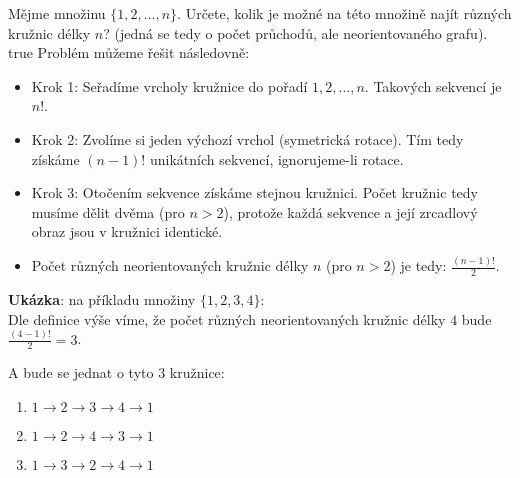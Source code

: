 \documentclass[10pt, a4paper]{ReportSheet}
\begin{document}
    \begin{uloha}{5}{2}{
        Mějme množinu $\{1, 2, \ldots, n\}$. Určete, kolik je možné na této množině najít různých kružnic délky $n$? (jedná se tedy o počet průchodů, ale neorientovaného grafu).
    }{true}
        Problém můžeme řešit následovně:
        \begin{itemize}
            \item Krok 1: Seřadíme vrcholy kružnice do pořadí $1, 2, \ldots, n$. Takových sekvencí je $n!$.
            \item Krok 2: Zvolíme si jeden výchozí vrchol (symetrická rotace). Tím tedy získáme $(n-1)!$ unikátních sekvencí, ignorujeme-li rotace.
            \item Krok 3: Otočením sekvence získáme stejnou kružnici. Počet kružnic tedy musíme dělit dvěma (pro $n>2$), protože každá sekvence a její zrcadlový obraz jsou v kružnici identické.
            \item Počet různých neorientovaných kružnic délky $n$ (pro $n>2$) je tedy: $\frac{(n-1)!}{2}$.
        \end{itemize}

        \textbf{Ukázka}: na příkladu množiny $\{1, 2, 3, 4\}$:\\
        Dle definice výše víme, že počet různých neorientovaných kružnic délky $4$ bude $\frac{(4-1)!}{2} = 3$.

        A bude se jednat o tyto 3 kružnice:
        \begin{enumerate}
            \item $1 \rightarrow 2 \rightarrow 3 \rightarrow 4 \rightarrow 1$
            \item $1 \rightarrow 2 \rightarrow 4 \rightarrow 3 \rightarrow 1$
            \item $1 \rightarrow 3 \rightarrow 2 \rightarrow 4 \rightarrow 1$
        \end{enumerate}


\end{uloha}
\end{document}
